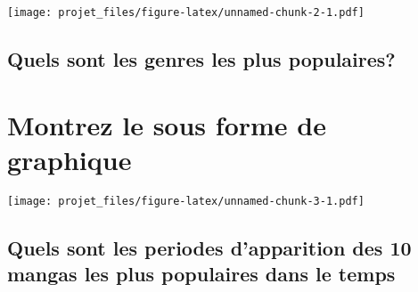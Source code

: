 \documentclass[]{article}
\newenvironment{Shaded}{\begin{snugshade}}{\end{snugshade}}
\newcommand{\DataTypeTok}[1]{\textcolor[rgb]{0.13,0.29,0.53}{#1}}
\newcommand{\DecValTok}[1]{\textcolor[rgb]{0.00,0.00,0.81}{#1}}
\newcommand{\KeywordTok}[1]{\textcolor[rgb]{0.13,0.29,0.53}{\textbf{#1}}}
\newcommand{\NormalTok}[1]{#1}
\newcommand{\OperatorTok}[1]{\textcolor[rgb]{0.81,0.36,0.00}{\textbf{#1}}}
\newcommand{\StringTok}[1]{\textcolor[rgb]{0.31,0.60,0.02}{#1}}
\begin{document}
\texttt{[image: projet\_files/figure-latex/unnamed-chunk-2-1.pdf]}

\hypertarget{quels-sont-les-genres-les-plus-populaires}{%
\subsection{Quels sont les genres les plus
populaires?}\label{quels-sont-les-genres-les-plus-populaires}}

\hypertarget{montrez-le-sous-forme-de-graphique-1}{%
\section{Montrez le sous forme de
graphique}\label{montrez-le-sous-forme-de-graphique-1}}

\begin{Shaded}
\end{Shaded}

\texttt{[image: projet\_files/figure-latex/unnamed-chunk-3-1.pdf]}

\hypertarget{quels-sont-les-periodes-dapparition-des-10-mangas-les-plus-populaires-dans-le-temps}{%
\subsection{Quels sont les periodes d'apparition des 10 mangas les plus
populaires dans le
temps}\label{quels-sont-les-periodes-dapparition-des-10-mangas-les-plus-populaires-dans-le-temps}}
\end{document}
